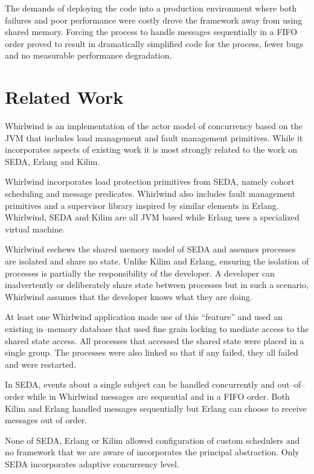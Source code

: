 \documentclass[conference]{IEEEtran}
\begin{document}
The demands of deploying the code into a production environment where both failures and poor performance were costly drove the framework away from using shared memory. Forcing the process to handle messages sequentially in a FIFO order proved to result in dramatically simplified code for the process, fewer bugs and no measurable performance degradation.

\section{Related Work}

Whirlwind is an implementation of the actor model of concurrency based on the JVM that includes load management and fault management primitives. While it incorporates aspects of existing work it is most strongly related to the work on SEDA, Erlang and Kilim. 

Whirlwind incorporates load protection primitives from SEDA, namely cohort scheduling and message predicates. Whirlwind also includes fault management primitives and a supervisor library inspired by similar elements in Erlang. Whirlwind, SEDA and Kilim are all JVM based while Erlang uses a specialized virtual machine.

Whirlwind eschews the shared memory model of SEDA and assumes processes are isolated and share no state. Unlike Kilim and Erlang, ensuring the isolation of processes is partially the responsibility of the developer. A developer can inadvertently or deliberately share state between processes but in such a scenario, Whirlwind assumes that the developer knows what they are doing. 

At least one Whirlwind application made use of this ``feature'' and used an existing in--memory database that used fine grain locking to mediate access to the shared state access. All processes that accessed the shared state were placed in a single group. The processes were also linked so that if any failed, they all failed and were restarted.

In SEDA, events about a single subject can be handled concurrently and out--of--order while in Whirlwind messages are sequential and in a FIFO order. Both Kilim and Erlang handled messages sequentially but Erlang can choose to receive messages out of order.

None of SEDA, Erlang or Kilim allowed configuration of custom schedulers and no framework that we are aware of incorporates the principal abstraction. Only SEDA incorporates adaptive concurrency level.
\end{document}
